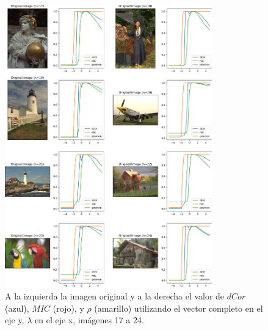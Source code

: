 \begin{figure}
    \centering
    \includegraphics[width=0.8\textwidth]{figuras/full_comp_3.png}
    \caption{A la izquierda la imagen original y a la derecha el valor de $dCor$ (azul), $MIC$ (rojo), y $\rho$ (amarillo) utilizando el vector completo en el eje y, $\lambda$ en el eje x, im\'agenes 17 a 24.}
\end{figure}

